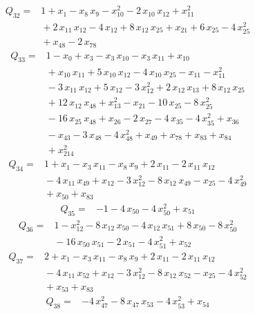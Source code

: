 \documentclass[11pt]{article}
\theoremstyle{definition}\newtheorem{definition}[theorem]{Definition}
\begin{document}
\begin{align*}
Q_{32}={}&1+x_{1}-x_{8}\,x_{9}-x_{10}^{2}-2\,x_{10}\,x_{12}+x_{11}^{2}
\\ &{}+2\,x_{11}\,x_{12}-4\,x_{12}+8\,x_{12}\,x_{25}+x_{21}+6\,x_{25}-4\,x_{25}^{2}
\\ &{}+x_{48}-2\,x_{78}
\end{align*}
\begin{align*}
Q_{33}={}&1-x_{0}+x_{3}-x_{3}\,x_{10}-x_{3}\,x_{11}+x_{10}
\\ &{}+x_{10}\,x_{11}+5\,x_{10}\,x_{12}-4\,x_{10}\,x_{25}-x_{11}-x_{11}^{2}
\\ &{}-3\,x_{11}\,x_{12}+5\,x_{12}-3\,x_{12}^{2}+2\,x_{12}\,x_{13}+8\,x_{12}\,x_{25}
\\ &{}+12\,x_{12}\,x_{48}+x_{13}^{2}-x_{21}-10\,x_{25}-8\,x_{25}^{2}
\\ &{}-16\,x_{25}\,x_{48}+x_{26}-2\,x_{27}-4\,x_{35}-4\,x_{35}^{2}+x_{36}
\\ &{}-x_{43}-3\,x_{48}-4\,x_{48}^{2}+x_{49}+x_{78}+x_{83}+x_{84}
\\ &{}+x_{214}^{2}
\end{align*}
\begin{align*}
Q_{34}={}&1+x_{1}-x_{3}\,x_{11}-x_{8}\,x_{9}+2\,x_{11}-2\,x_{11}\,x_{12}
\\ &{}-4\,x_{11}\,x_{49}+x_{12}-3\,x_{12}^{2}-8\,x_{12}\,x_{49}-x_{25}-4\,x_{49}^{2}
\\ &{}+x_{50}+x_{83}
\end{align*}
\begin{align*}
Q_{35}={}&-1-4\,x_{50}-4\,x_{50}^{2}+x_{51}
\end{align*}
\begin{align*}
Q_{36}={}&1-x_{12}^{2}-8\,x_{12}\,x_{50}-4\,x_{12}\,x_{51}+8\,x_{50}-8\,x_{50}^{2}
\\ &{}-16\,x_{50}\,x_{51}-2\,x_{51}-4\,x_{51}^{2}+x_{52}
\end{align*}
\begin{align*}
Q_{37}={}&2+x_{1}-x_{3}\,x_{11}-x_{8}\,x_{9}+2\,x_{11}-2\,x_{11}\,x_{12}
\\ &{}-4\,x_{11}\,x_{52}+x_{12}-3\,x_{12}^{2}-8\,x_{12}\,x_{52}-x_{25}-4\,x_{52}^{2}
\\ &{}+x_{53}+x_{83}
\end{align*}
\begin{align*}
Q_{38}={}&-4\,x_{47}^{2}-8\,x_{47}\,x_{53}-4\,x_{53}^{2}+x_{54}
\end{align*}
\end{document}
